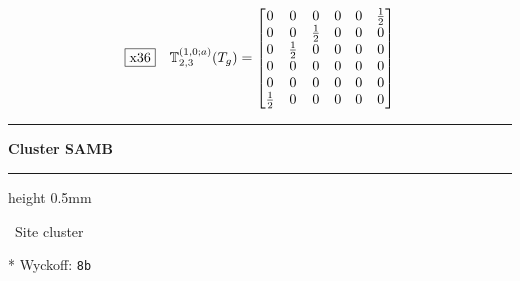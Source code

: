 \documentclass[fleqn,10pt,landscape]{jsarticle}
\begin{document}
\begin{dmath*}
\fbox{x36}\quad \mathbb{T}_{2,3}^{(1,0;a)}(T_{g})=\begin{bmatrix} 0 & 0 & 0 & 0 & 0 & \frac{1}{2} \\ 0 & 0 & \frac{1}{2} & 0 & 0 & 0 \\ 0 & \frac{1}{2} & 0 & 0 & 0 & 0 \\ 0 & 0 & 0 & 0 & 0 & 0 \\ 0 & 0 & 0 & 0 & 0 & 0 \\ \frac{1}{2} & 0 & 0 & 0 & 0 & 0 \end{bmatrix}
\end{dmath*}
\vspace{5mm}
\noindent \rule[0.5mm]{5mm}{0.5mm}\hspace{3mm}\textbf{Cluster SAMB}\hspace{3mm}\leaders\hrule height 0.5mm\hfill\kern0pt
\vspace{3mm}

\noindent\textbullet\, Site cluster

\vspace{5mm}

\noindent ** Wyckoff: \texttt{8b}
\end{document}
